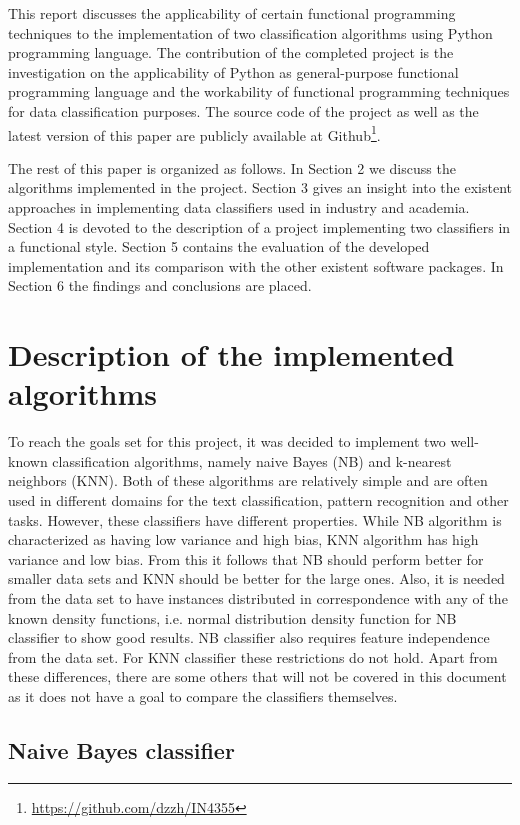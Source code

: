 \documentclass{llncs}
\begin{document}
This report discusses the applicability of certain functional programming techniques to the implementation of two classification algorithms using Python programming language. The contribution of the completed project is the investigation on the applicability of Python as general-purpose functional programming language and the workability of functional programming techniques for data classification purposes. The source code of the project as well as the latest version of this paper are publicly available at Github\footnote{\url{https://github.com/dzzh/IN4355}}.

The rest of this paper is organized as follows. In Section 2 we discuss the algorithms implemented in the project. Section 3 gives an insight into the existent approaches in implementing data classifiers used in industry and academia. Section 4 is devoted to the description of a project implementing two classifiers in a functional style. Section 5 contains the evaluation of the developed implementation and its comparison with the other existent software packages. In Section 6 the findings and conclusions are placed.

\section{Description of the implemented algorithms}

To reach the goals set for this project, it was decided to implement two well-known classification algorithms, namely naive Bayes (NB) and k-nearest neighbors (KNN). Both of these algorithms are relatively simple and are often used in different domains for the text classification, pattern recognition and other tasks. However, these classifiers have different properties. While NB algorithm is characterized as having low variance and high bias, KNN algorithm has high variance and low bias. From this it follows that NB should perform better for smaller data sets and KNN should be better for the large ones. Also, it is needed from the data set to have instances distributed in correspondence with any of the known density functions, i.e. normal distribution density function for NB classifier to show good results. NB classifier also requires feature independence from the data set. For KNN classifier these restrictions do not hold. Apart from these differences, there are some others that will not be covered in this document as it does not have a goal to compare the classifiers themselves. 

\subsection{Naive Bayes classifier}
\end{document}
